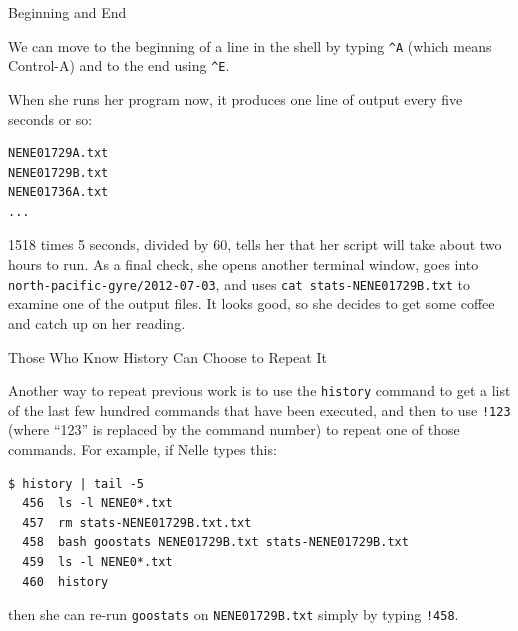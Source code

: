 \documentclass{book}
\begin{document}
\begin{swcbox}{Beginning and End}

We can move to the beginning of a line in the shell by typing
\texttt{\^{}A} (which means Control-A) and to the end using
\texttt{\^{}E}.

\end{swcbox}

When she runs her program now, it produces one line of output every five
seconds or so:

\begin{verbatim}
NENE01729A.txt
NENE01729B.txt
NENE01736A.txt
...
\end{verbatim}

1518 times 5 seconds, divided by 60, tells her that her script will take
about two hours to run. As a final check, she opens another terminal
window, goes into \texttt{north-pacific-gyre/2012-07-03}, and uses
\texttt{cat stats-NENE01729B.txt} to examine one of the output files. It
looks good, so she decides to get some coffee and catch up on her
reading.

\begin{swcbox}{Those Who Know History Can Choose to Repeat It}

Another way to repeat previous work is to use the \texttt{history}
command to get a list of the last few hundred commands that have been
executed, and then to use \texttt{!123} (where ``123'' is replaced by
the command number) to repeat one of those commands. For example, if
Nelle types this:

\begin{verbatim}
$ history | tail -5
  456  ls -l NENE0*.txt
  457  rm stats-NENE01729B.txt.txt
  458  bash goostats NENE01729B.txt stats-NENE01729B.txt
  459  ls -l NENE0*.txt
  460  history
\end{verbatim}

then she can re-run \texttt{goostats} on \texttt{NENE01729B.txt} simply
by typing \texttt{!458}.

\end{swcbox}
\end{document}
